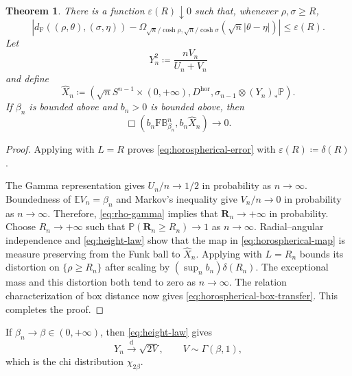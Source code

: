 \documentclass{amsart}
\numberwithin{equation}{section}
\theoremstyle{plain}
\newtheorem{theorem}{Theorem}[section]
\theoremstyle{definition}
\theoremstyle{remark}
\newcommand{\BetaBall}{\mathrm F\mathbb B^n_{\beta_n}}
\newcommand{\dF}{d_{\mathrm F}}
\newcommand{\eps}{\varepsilon}
\begin{document}
\begin{theorem}\label{thm:horospherical-transfer}
There is a function $\eps(R)\downarrow0$ such that, whenever $\rho,\sigma\ge R$,
\begin{equation}\label{eq:horospherical-error} \left|\dF((\rho,\theta),(\sigma,\eta)) -\Omega_{\sqrt n/\cosh\rho,\sqrt n/\cosh\sigma} (\sqrt n|\theta-\eta|)\right| \le\eps(R). \end{equation}
Let
\begin{equation}\label{eq:height-law} Y_n^2\coloneqq\frac{nV_n}{U_n+V_n} \end{equation}
and define
\begin{equation}\label{eq:upper-half-comparison-space} \widehat X_n \coloneqq\left(\sqrt nS^{n-1}\times(0,+\infty),D^{\mathrm{hor}}, \sigma_{n-1}\otimes (Y_n)_*\mathbb P\right). \end{equation}
If $\beta_n$ is bounded above and $b_n>0$ is bounded above, then
\begin{equation}\label{eq:horospherical-box-transfer} \Box(b_n\BetaBall,b_n\widehat X_n) \longrightarrow0. \end{equation}
\end{theorem}

\begin{proof}
Applying  with $L=R$ proves \eqref{eq:horospherical-error} with $\eps(R)\coloneqq\delta(R)$.

The Gamma representation gives $U_n/n\to1/2$ in probability as $n\to\infty$.  Boundedness of $\mathbb EV_n=\beta_n$ and Markov's inequality give $V_n/n\to0$ in probability as $n\to\infty$.  Therefore, \eqref{eq:rho-gamma} implies that $\mathbf R_n\to+\infty$ in probability.  Choose $R_n\to+\infty$ such that $\mathbb P(\mathbf R_n\ge R_n)\to1$ as $n\to\infty$.  Radial--angular independence and \eqref{eq:height-law} show that the map in \eqref{eq:horospherical-map} is measure preserving from the Funk ball to $\widehat X_n$.  Applying  with $L=R_n$ bounds its distortion on $\{\rho\ge R_n\}$ after scaling by $(\sup_nb_n)\delta(R_n)$.  The exceptional mass and this distortion both tend to zero as $n\to\infty$.  The relation characterization of box distance now gives \eqref{eq:horospherical-box-transfer}.  This completes the proof.
\end{proof}

If $\beta_n\to\beta\in(0,+\infty)$, then \eqref{eq:height-law} gives
\begin{equation}\label{eq:height-fixed-beta} Y_n\overset{\mathrm{d}}{\longrightarrow}\sqrt{2V}, \qquad V\sim\Gamma(\beta,1), \end{equation}
which is the chi distribution $\chi_{2\beta}$.
\end{document}
